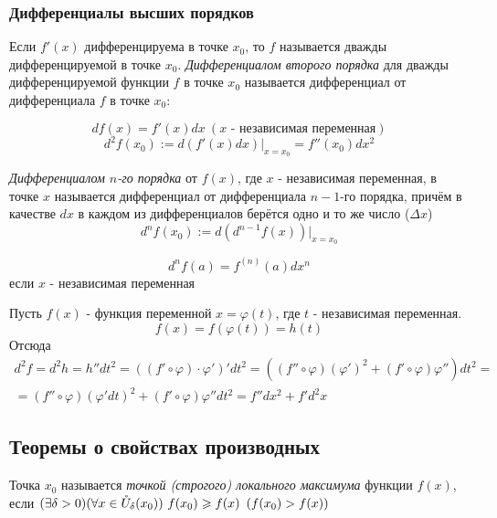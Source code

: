 \subsubsection*{Дифференциалы высших порядков}

\begin{definition}
	Если $f'(x)$ дифференцируема в точке $x_0$, то $f$ называется
	дважды дифференцируемой в точке $x_0$. \textit{Дифференциалом второго
	порядка} для дважды дифференцируемой функции $f$ в точке $x_0$
	называется дифференциал от дифференциала $f$ в точке $x_0$:

	\[
	df(x) = f'(x)dx\  (x \text{ - независимая переменная})
	\]
	\[
	d^2 f(x_0) := d(f'(x)dx) \big|_{x = x_0} = f''(x_0) dx^2
	\]

	\textit{Дифференциалом $n$-го порядка} от $f(x)$,
	где $x$ - независимая переменная, в точке $x$ называется
	дифференциал от дифференциала $n - 1$-го порядка, причём
	в качестве $dx$ в каждом из дифференциалов берётся одно
	и то же число ($\Delta x$)
	\[
		d^{n}f(x_0) := d(d^{n - 1}f(x)) \big|_{x=x_0}
	\]
\end{definition}

\begin{corollary}
	\[
		d^nf(a) = f^{(n)}(a) dx^n
	\]
	если $x$ - независимая переменная
\end{corollary}

\begin{example}
	Пусть $f(x)$ - функция переменной $x = \varphi(t)$, где $t$ - независимая переменная.
	\[
		f(x) = f(\varphi(t)) = h(t)
	\]
	Отсюда
	\begin{multline*}
		d^2f = d^2h = h'' dt^2 = \left((f' \circ \varphi)
		\cdot \varphi'\right)'dt^2 = \left((f'' \circ \varphi)
		(\varphi')^2 + (f' \circ \varphi)\varphi''\right)dt^2 = \\
		= (f'' \circ \varphi)(\varphi'dt)^2 + (f' \circ \varphi)
		\varphi'' dt^2 = f''dx^2 + f'd^2x
	\end{multline*}
\end{example}

\subsection{Теоремы о свойствах производных}

\begin{definition}
	Точка $x_0$ называется \textit{точкой (строгого)
	локального максимума} функции $f(x)$, если $(\exists \delta > 0)
	(\forall x \in \mc{U}_{\delta}(x_0))\ f(x_0) \ge f(x)\ 
	\left(f(x_0) > f(x)\right)$
\end{definition}

